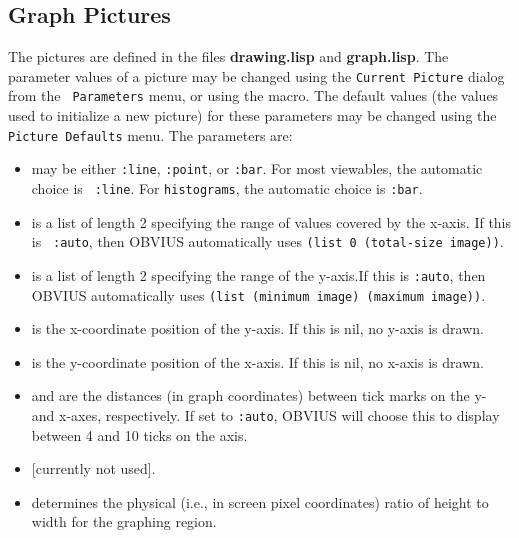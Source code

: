 
\subsection{Graph Pictures}
\label{sec:graph}

The  pictures are defined in the files {\bf drawing.lisp} and
{\bf graph.lisp}.  The parameter values of a  picture may
be changed using the {\tt Current Picture} dialog from the {\tt
Parameters} menu, or using the  macro.  The default values
(the values used to initialize a new picture) for these parameters may
be changed using the {\tt Picture Defaults} menu.  The parameters are:
\begin{itemize}
\item {} may be either {\tt :line}, {\tt :point}, 
or {\tt :bar}.  For most viewables, the automatic choice is {\tt
:line}.  For {\tt histograms}, the automatic choice is {\tt :bar}.

\item {} is a list of length 2 specifying the range of
values covered by the x-axis.  If this is {\tt
:auto}, then OBVIUS automatically uses {\tt (list
0 (total-size image))}.

\item {} is a list of length 2 specifying the range of
the y-axis.If this is {\tt :auto}, then OBVIUS
automatically uses {\tt (list (minimum image) (maximum image))}.

\item {} is the x-coordinate position of the y-axis.  If
this is nil, no y-axis is drawn.

\item {} is the y-coordinate position of the x-axis.  If
this is nil, no x-axis is drawn.

\item {} and   are the distances 
(in graph coordinates) between tick marks on the y- and x-axes,
respectively.  If set to {\tt :auto}, OBVIUS
will choose this to display between 4 and 10 ticks on the axis.

\item {}  [currently not used].

\item {} determines the physical (i.e., in screen
pixel coordinates) ratio of height to width for the graphing region.


\end{itemize}
